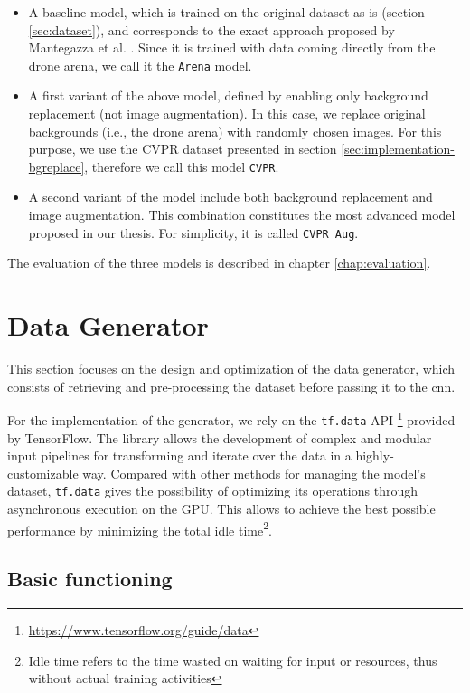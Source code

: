 \begin{itemize}
    \item A baseline model, which is trained on the original dataset as-is (section \ref{sec:dataset}), and corresponds to the exact approach proposed by Mantegazza et al. \cite{mantegazza2019visionbased}. Since it is trained with data coming directly from the drone arena, we call it the \texttt{Arena} model.
    \item A first variant of the above model, defined by enabling only background replacement (not image augmentation). In this case, we replace original backgrounds (i.e., the drone arena) with randomly chosen images. For this purpose, we use the CVPR dataset presented in section \ref{sec:implementation-bgreplace}, therefore we call this model \texttt{CVPR}.
    \item A second variant of the model include both background replacement and image augmentation. This combination constitutes the most advanced model proposed in our thesis. For simplicity, it is called \texttt{CVPR Aug}.
\end{itemize}

The evaluation of the three models is described in chapter \ref{chap:evaluation}.




\section{Data Generator}
\label{sec:data-generator}

This section focuses on the design and optimization of the data generator, which consists of retrieving and pre-processing the dataset before passing it to the \gls{cnn}.

For the implementation of the generator, we rely on the \texttt{tf.data} API \footnote{\url{https://www.tensorflow.org/guide/data}} provided by TensorFlow. The library allows the development of complex and modular input pipelines for transforming and iterate over the data in a highly-customizable way. Compared with other methods for managing the model's dataset, \texttt{tf.data} gives the possibility of optimizing its operations through asynchronous execution on the GPU. This allows to achieve the best possible performance by minimizing the total idle time\footnote{Idle time refers to the time wasted on waiting for input or resources, thus without actual training activities}.



\subsection{Basic functioning}
\label{subsec:data-generator-basic}

